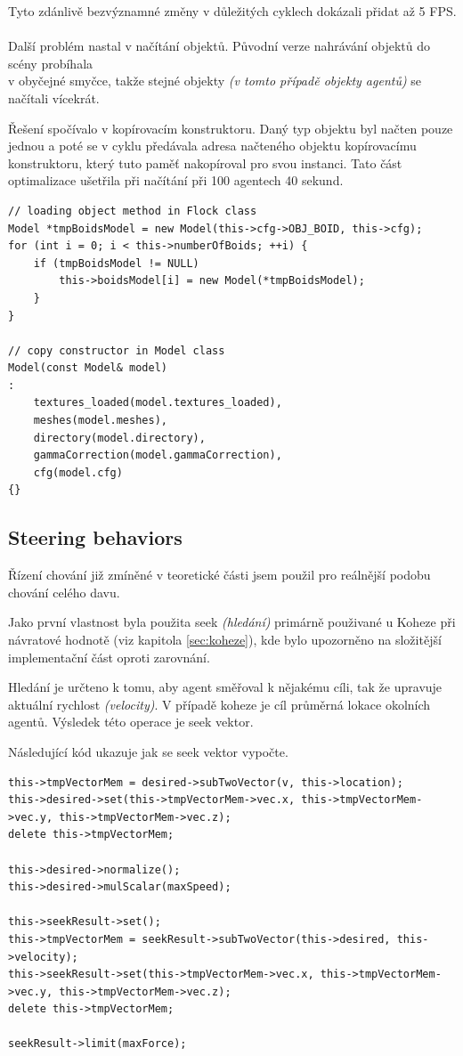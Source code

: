 \documentclass[czech,public,dept460,male,cpdeclaration]{diploma}
\begin{document}
Tyto zdánlivě bezvýznamné změny v důležitých cyklech dokázali přidat až 5 FPS.
\\\\
Další problém nastal v načítání objektů. Původní verze nahrávání objektů do scény probíhala\\ v obyčejné smyčce, takže stejné objekty \textit{(v tomto případě objekty agentů)} se načítali vícekrát. 

Řešení spočívalo v kopírovacím konstruktoru. Daný typ objektu byl načten pouze jednou a poté se v cyklu předávala adresa načteného objektu kopírovacímu konstruktoru, který tuto paměť nakopíroval pro svou instanci. Tato část optimalizace ušetřila při načítání při 100 agentech 40 sekund.

\begin{lstlisting}[label=src:copy constructor,caption=Ukázka použití kopírovacího konstruktoru]
// loading object method in Flock class
Model *tmpBoidsModel = new Model(this->cfg->OBJ_BOID, this->cfg);
for (int i = 0; i < this->numberOfBoids; ++i) {
	if (tmpBoidsModel != NULL)
		this->boidsModel[i] = new Model(*tmpBoidsModel);
	}
}

// copy constructor in Model class
Model(const Model& model) 
: 
	textures_loaded(model.textures_loaded),
	meshes(model.meshes),
	directory(model.directory),
	gammaCorrection(model.gammaCorrection),
	cfg(model.cfg)
{}
\end{lstlisting}

\subsection{Steering behaviors}
Řízení chování \cite{linkToSteeringBehaviors} již zmíněné v teoretické části jsem použil pro reálnější podobu chování celého davu.

Jako první vlastnost byla použita seek \textit{(hledání)} primárně použivané u Koheze při návratové hodnotě (viz kapitola \ref{sec:koheze}), kde bylo upozorněno na složitější implementační část oproti zarovnání.

Hledání je určteno k tomu, aby agent směřoval k nějakému cíli, tak že upravuje aktuální rychlost \textit{(velocity)}. V případě koheze je cíl průměrná lokace okolních agentů. Výsledek této operace je seek vektor.

Následující kód ukazuje jak se seek vektor vypočte.

\begin{lstlisting}[label=src:seek,caption=Vypočtení seek vektoru]
this->tmpVectorMem = desired->subTwoVector(v, this->location);
this->desired->set(this->tmpVectorMem->vec.x, this->tmpVectorMem->vec.y, this->tmpVectorMem->vec.z);
delete this->tmpVectorMem;

this->desired->normalize();
this->desired->mulScalar(maxSpeed);

this->seekResult->set();
this->tmpVectorMem = seekResult->subTwoVector(this->desired, this->velocity);
this->seekResult->set(this->tmpVectorMem->vec.x, this->tmpVectorMem->vec.y, this->tmpVectorMem->vec.z);
delete this->tmpVectorMem;

seekResult->limit(maxForce);
\end{lstlisting}
\end{document}
